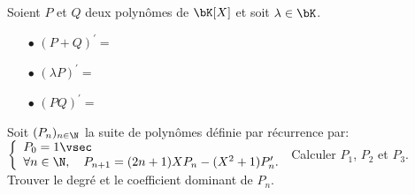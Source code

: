 \documentclass[a4paper, 11pt,reqno]{article}
\begin{document}
{\noindent

	\begin{prop}
		Soient $P$ et $Q$ deux polyn\^omes de $\bK[X]$ et soit $\lambda \in\bK$.
		\begin{itemize}
			\item[$\bullet$] $(P+Q)^{\prime}=$\dotfill\vsec
			\item[$\bullet$]  $(\lambda P)^{\prime}=$\dotfill\vsec
			\item[$\bullet$]  $(PQ)^{\prime}=$\dotfill\vsec
		\end{itemize}
	\end{prop}
}

{\footnotesize \begin{exercice}
		Soit $(P_n)_{n\in\N}$ la suite de polyn\^omes d\'efinie par r\'ecurrence par: $\left\lbrace\begin{array}{l}
				P_0=1\vsec \\
				\forall n\in\N,\quad P_{n+1}=(2n+1)XP_n-(X^2+1)P_n^{\prime}.
			\end{array}\right.$ Calculer $P_1$, $P_2$ et $P_3$. Trouver le degr\'e et le coefficient dominant de $P_n$.
	\end{exercice}}

\end{document}
